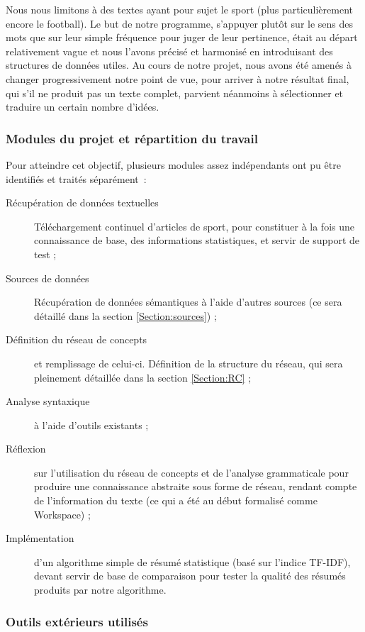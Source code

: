 \documentclass[a4paper, 12pt]{article}
\begin{document}
Nous nous limitons à des textes ayant pour sujet le sport (plus particulièrement encore le football). Le but de notre programme, s'appuyer plutôt sur le sens des mots que sur leur simple fréquence pour juger de leur pertinence, était au départ relativement vague et nous l'avons précisé et harmonisé en introduisant des structures de données utiles. Au cours de notre projet, nous avons été amenés à changer progressivement notre point de vue, pour arriver à notre résultat final, qui s'il ne produit pas un texte complet, parvient néanmoins à sélectionner et traduire un certain nombre d'idées.


\subsubsection{Modules du projet et répartition du travail}


Pour atteindre cet objectif, plusieurs modules assez indépendants ont pu être identifiés et traités séparément~:


\begin{description}
	\item[Récupération de données textuelles] Téléchargement continuel d'articles de sport, pour constituer à la fois une connaissance de base, des informations statistiques, et servir de support de test ;
	\item[Sources de données] Récupération de données sémantiques à l'aide d'autres sources (ce sera détaillé dans la section \ref{Section:sources}) ;
	\item[Définition du réseau de concepts] et remplissage de celui-ci. Définition de la structure du réseau, qui sera pleinement détaillée dans la section \ref{Section:RC} ;
	\item[Analyse syntaxique] à l'aide d'outils existants ;
	\item[Réflexion] sur l'utilisation du réseau de concepts et de l'analyse grammaticale pour produire une connaissance abstraite sous forme de réseau, rendant compte de l'information du texte (ce qui a été au début formalisé comme Workspace) ;
	\item[Implémentation] d'un algorithme simple de résumé statistique (basé sur l'indice TF-IDF), devant servir de base de comparaison pour tester la qualité des résumés produits par notre algorithme.
\end{description}

\subsubsection{Outils extérieurs utilisés}
\end{document}
